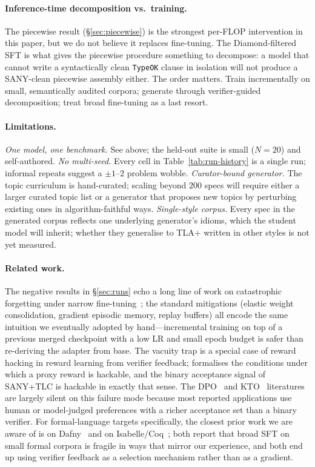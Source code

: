 \documentclass[11pt]{article}
\begin{document}
\paragraph{Inference-time decomposition vs.\ training.} The piecewise
result (\S\ref{sec:piecewise}) is the strongest per-FLOP intervention
in this paper, but we do not believe it replaces fine-tuning. The
Diamond-filtered SFT is what gives the piecewise procedure something
to decompose: a model that cannot write a syntactically clean
\texttt{TypeOK} clause in isolation will not produce a SANY-clean
piecewise assembly either. The order matters. Train incrementally on
small, semantically audited corpora; generate through verifier-guided
decomposition; treat broad fine-tuning as a last resort.

\paragraph{Limitations.}
\emph{One model, one benchmark.} See above; the held-out suite is
small ($N=20$) and self-authored. \emph{No multi-seed.} Every cell in
Table~\ref{tab:run-history} is a single run; informal repeats suggest
a $\pm 1$--$2$ problem wobble. \emph{Curator-bound generator.} The
topic curriculum is hand-curated; scaling beyond $200$ specs will
require either a larger curated topic list or a generator that
proposes new topics by perturbing existing ones in algorithm-faithful
ways. \emph{Single-style corpus.} Every spec in the generated corpus
reflects one underlying generator's idioms, which the student model
will inherit; whether they generalise to TLA+ written in other styles
is not yet measured.

\paragraph{Related work.} The negative results in
\S\ref{sec:runs} echo a long line of work on catastrophic forgetting
under narrow fine-tuning~\cite{kirkpatrick2017ewc, lopez2017gem}; the
standard mitigations (elastic weight consolidation, gradient episodic
memory, replay buffers) all encode the same intuition we eventually
adopted by hand---incremental training on top of a previous merged
checkpoint with a low LR and small epoch budget is safer than
re-deriving the adapter from base. The vacuity trap is a special case
of reward hacking in reward learning from verifier feedback;
\cite{skalse2022defining} formalises the conditions under which a
proxy reward is hackable, and the binary acceptance signal of SANY+TLC
is hackable in exactly that sense. The DPO~\cite{rafailov2023direct}
and KTO~\cite{ethayarajh2024kto} literatures are largely silent on this
failure mode because most reported applications use human or
model-judged preferences with a richer acceptance set than a binary
verifier. For formal-language targets specifically, the closest prior
work we are aware of is on Dafny~\cite{misu2024towards} and on
Isabelle/Coq~\cite{first2023baldur}; both report that broad SFT on
small formal corpora is fragile in ways that mirror our experience,
and both end up using verifier feedback as a selection mechanism
rather than as a gradient.
\end{document}
